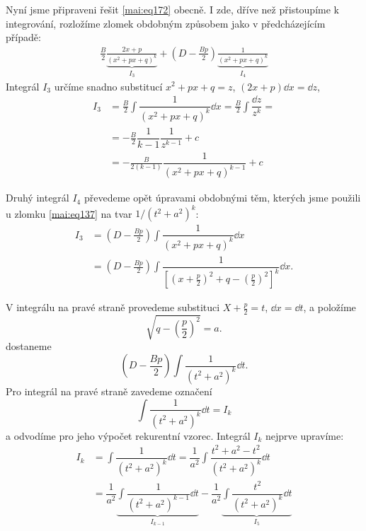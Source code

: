       Nyní jsme připraveni řešit \ref{mai:eq172} obecně. I zde, dříve než přistoupíme k integrování,
      rozložíme zlomek obdobným způsobem jako v předcházejícím případě:
      \begin{gather*}
        \frac{B}{2}\underbrace{\frac{2x + p}{(x^2+px+q)^k}}_{I_3} + 
        \left(D - \frac{Bp}{2}\right)\underbrace{\frac{1}{(x^2+px+q)^k}}_{I_4}
      \end{gather*} 
      Integrál \(I_3\) určíme snadno substitucí \(x^2+px+q = z\), \((2x+p)\dd{x} = \dd{z}\),
      \begin{align}
        I_3 &= \frac{B}{2}\int\dfrac{1}{(x^2+px+q)^k}\dd{x} 
             = \frac{B}{2}\int\dfrac{\dd{z}}{z^k} =                                \nonumber   \\
            &=-\frac{B}{2}\dfrac{1}{k-1}\dfrac{1}{z^{k-1}} + c                     \nonumber   \\
            &=-\frac{B}{2(k-1)}\dfrac{1}{(x^2+px+q)^{k-1}} + c                     \label{mai:eq173} 
      \end{align}      

      Druhý integrál \(I_4\) převedeme opět úpravami obdobnými těm, kterých jsme použili u zlomku
      \ref{mai:eq137} na tvar \(1/(t^2+a^2)^k\):
      \begin{align*}
        I_3 &= \left(D - \frac{Bp}{2}\right)\int\dfrac{1}{(x^2+px+q)^k}\dd{x}      \nonumber   \\  
            &= \left(D - \frac{Bp}{2}\right)\int\dfrac{1}{
                  \left[
                    \left(
                      x+\frac{p}{2}
                    \right)^2+q-
                    \left(
                      \frac{p}{2}
                    \right)^2
                  \right]^k
                }\dd{x}.
      \end{align*}    

      V integrálu na pravé straně provedeme substituci \(X + \frac{p}{2} = t\), \(\dd{x} = \dd{t}\),
      a položíme 
      \begin{equation*}
        \sqrt{q - \left(\dfrac{p}{2}\right)^2} = a.
      \end{equation*}
      dostaneme
      \begin{equation*}
        \left(D - \frac{Bp}{2}\right)\int\dfrac{1}{(t^2+a^2)^k}\dd{t}.
      \end{equation*}
      Pro integrál na pravé straně zavedeme označení
      \begin{equation*}
        \int\dfrac{1}{(t^2+a^2)^k}\dd{t} = I_k
      \end{equation*}
      a odvodíme pro jeho výpočet rekurentní vzorec. Integrál \(I_k\) nejprve upravíme:
      \begin{align*}
        I_k &= \int\dfrac{1}{(t^2+a^2)^k}\dd{t} 
             = \dfrac{1}{a^2}\int\dfrac{t^2+a^2-t^2}{(t^2+a^2)^k}\dd{t}                       \\
            &= \dfrac{1}{a^2}\underbrace{\int\dfrac{1}{(t^2+a^2)^{k-1}}\dd{t}}_{I_{k-1}}          
             - \dfrac{1}{a^2}\underbrace{\int\dfrac{t^2}{(t^2+a^2)^k}\dd{t}}_{I_5}                
      \end{align*}

